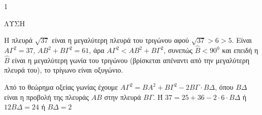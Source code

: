 \begin{ylh}{1}
    \item [Ύλη από εικόνα]
\end{ylh}
ΛΥΣΗ
\begin{alist}
\item Η πλευρά $\sqrt{37}$ είναι η μεγαλύτερη πλευρά του τριγώνου αφού $\sqrt{37} > 6 > 5$.
Είναι $ΑΓ^2 = 37$, $ΑΒ^2 + ΒΓ^2 = 61$, άρα $ΑΓ^2 < ΑΒ^2 + ΒΓ^2$, συνεπώς $\hat{B} < 90^0$ και επειδή η $\hat{B}$ είναι η μεγαλύτερη γωνία του τριγώνου (βρίσκεται απέναντι από την μεγαλύτερη πλευρά του), το τρίγωνο είναι οξυγώνιο.
\item Από το θεώρημα οξείας γωνίας έχουμε $ΑΓ^2 = ΒΑ^2 + ΒΓ^2 - 2ΒΓ \cdot ΒΔ$, όπου $ΒΔ$ είναι η προβολή της πλευράς $ΑΒ$ στην πλευρά $ΒΓ$.
Ή $37 = 25 + 36 - 2 \cdot 6 \cdot ΒΔ$ ή $12ΒΔ = 24$ ή $ΒΔ = 2$
\end{alist}